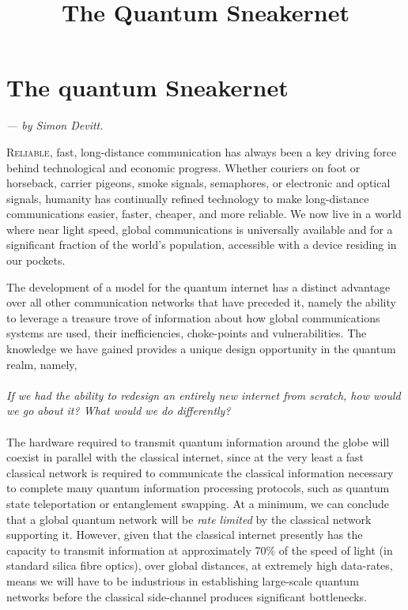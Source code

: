 \documentclass[twocolumn, aps, rmp, amsmath, amssymb, nofootinbib, superscriptaddress, longbibliography, floatfix, table-of-contents, eqsecnum]{revtex4-2}
\newcommand{\sectionby}[1]{\begin{center}\textit{--- by #1.}\end{center}}
\newcommand{\dropcap}[2]{\lettrine[lines=2, findent=3pt, nindent=0pt]{#1}{#2}}
\newcommand{\comment}[1]{{\color{blue}{\textbf{#1}}}}
\begin{document}
\title{The Quantum Sneakernet}

\maketitle

\tableofcontents 

\section{The quantum Sneakernet\texttrademark}\label{sec:sneakernet}

\sectionby{Simon Devitt}

\dropcap{R}{eliable}, fast, long-distance communication has always been a key driving force behind technological and economic progress. Whether couriers on foot or horseback, carrier pigeons, smoke signals, semaphores, or electronic and optical signals, humanity has continually refined technology to make long-distance communications easier, faster, cheaper, and more reliable. We now live in a world where near light speed, global communications is universally available and for a significant fraction of the world's population, accessible with a device residing in our pockets. 

The development of a model for the quantum internet \cite{?} has a distinct advantage over all other communication networks that have preceded it, namely the ability to leverage a treasure trove of information about how global communications systems are used, their inefficiencies, choke-points and vulnerabilities. The knowledge we have gained provides a unique design opportunity in the quantum realm, namely, 
\\
\\
\textit{If we had the ability to redesign an entirely new internet from scratch, how would we go about it? What would we do differently?}
\\
\\
The hardware required to transmit quantum information around the globe will coexist in parallel with the classical internet, since at the very least a fast classical network is required to communicate the classical information necessary to complete many quantum information processing protocols, such as quantum state teleportation or entanglement swapping. At a minimum, we can conclude that a global quantum network will be \textit{rate limited} by the classical network supporting it. However, given that the classical internet presently has the capacity to transmit information at approximately 70\% of the speed of light (in standard silica fibre optics), over global distances, at extremely high data-rates, means we will have to be industrious in establishing large-scale quantum networks before the classical side-channel produces significant bottlenecks.\comment{Don't get this last part of the sentence}
\end{document}
